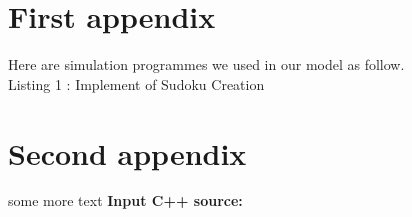 \documentclass{mcmthesis}
\begin{document}
\begin{appendices}

\section{First appendix}

Here are simulation programmes we used in our model as follow.\\

\centering
Listing 1 : Implement of Sudoku Creation











\section{Second appendix}
some more text \textcolor[rgb]{0.98,0.00,0.00}{\textbf{Input C++ source:}}


\end{appendices}
\end{document}
